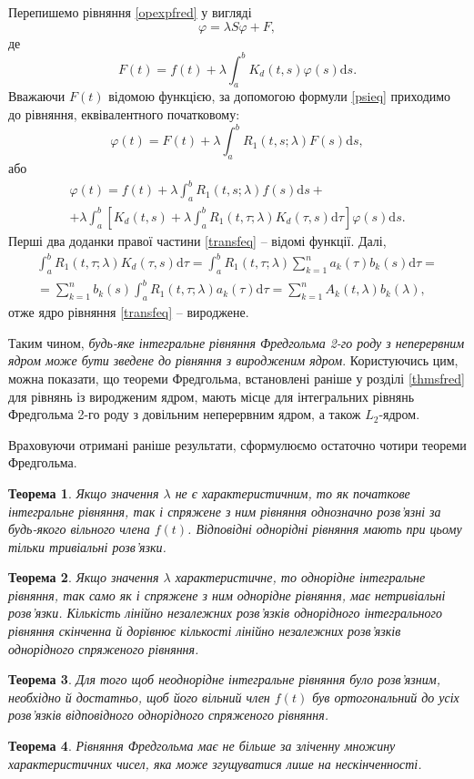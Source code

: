 \documentclass[14pt,twoside]{extreport}
\theoremstyle{mystyle}
\newtheorem{thm}{Теорема}
\numberwithin{equation}{chapter}
\begin{document}
Перепишемо рівняння \eqref{opexpfred} у вигляді
\[
\varphi = \lambda S \varphi + F,
\]
де
\[
F(t) = f(t) + \lambda \int_{a}^{b} K_d (t, s) \varphi(s) \mathrm{d}s.
\]
Вважаючи $F(t)$ відомою функцією, за допомогою формули \eqref{psieq} приходимо до рівняння, еквівалентного початковому:
\[
\varphi(t) = F(t) + \lambda \int_{a}^{b} R_1(t, s; \lambda) F(s) \mathrm{d}s,
\]
або
\begin{multline}\label{transfeq}
\varphi(t) = f(t) + \lambda \int_{a}^{b} R_1(t, s; \lambda) f(s) \mathrm{d}s +\\
+ \lambda \int_{a}^{b} \left[K_d(t, s) + \lambda \int_{a}^{b} R_1(t, \tau; \lambda) K_d(\tau, s) \mathrm{d}\tau\right] \varphi(s) \mathrm{d}s.
\end{multline}
Перші два доданки правої частини \eqref{transfeq} -- відомі функції. Далі,
\begin{multline*}
\int_{a}^{b} R_1(t, \tau; \lambda) K_d(\tau, s) \mathrm{d}\tau = \int_{a}^{b} R_1(t, \tau; \lambda) \sum_{k=1}^{n} a_k(\tau) b_k(s) \mathrm{d}\tau =\\
=\sum_{k=1}^{n} b_k(s) \int_{a}^{b} R_1(t, \tau; \lambda)  a_k(\tau) \mathrm{d}\tau = \sum_{k=1}^{n} A_k(t, \lambda) b_k(\lambda),
\end{multline*}
отже ядро рівняння \eqref{transfeq} -- вироджене.

Таким чином, \emph{будь-яке інтегральне рівняння Фредгольма 2-го роду з неперервним ядром може бути зведене до рівняння з виродженим ядром}. Користуючись цим, можна показати, що теореми Фредгольма, встановлені раніше у розділі \ref{thmsfred} для рівнянь із виродженим ядром, мають місце для інтегральних рівнянь Фредгольма 2-го роду з довільним неперервним ядром, а також $L_2$-ядром.

Враховуючи отримані раніше результати, сформулюємо остаточно чотири теореми Фредгольма.

\begin{thm}\label{fft}
Якщо значення $\lambda$ не є характеристичним, то як початкове інтегральне рівняння, так і спряжене з ним рівняння однозначно розв'язні за будь-якого вільного члена $f(t)$. Відповідні однорідні рівняння мають при цьому тільки тривіальні розв'язки.
\end{thm}
\begin{thm}
Якщо значення $\lambda$ характеристичне, то однорідне інтегральне рівняння, так само як і спряжене з ним однорідне рівняння, має нетривіальні розв'язки. Кількість лінійно незалежних розв'язків однорідного інтегрального рівняння скінченна й дорівнює кількості лінійно незалежних розв'язків однорідного спряженого рівняння.
\end{thm}
\begin{thm}\label{thirdfredthm}
Для того щоб неоднорідне інтегральне рівняння було розв'язним, необхідно й достатньо, щоб його вільний член $f(t)$ був ортогональний до усіх розв'язків відповідного однорідного спряженого рівняння.
\end{thm}
\begin{thm}
Рівняння Фредгольма має не більше за зліченну множину характеристичних чисел, яка може згущуватися лише на нескінченності.
\end{thm}
\end{document}
